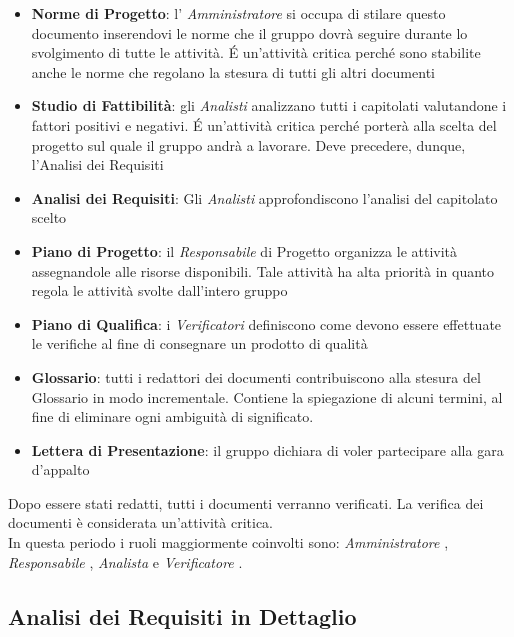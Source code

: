 \begin{itemize}
\item \textbf{Norme di Progetto}: l’ \emph{Amministratore}  si occupa di stilare questo documento
  inserendovi le norme che il gruppo dovrà seguire durante lo svolgimento di tutte
  le attività. \'E un'attività critica perché sono stabilite anche le norme
  che regolano la stesura di tutti gli altri documenti

\item \textbf{Studio di Fattibilità}: gli  \emph{Analisti}  analizzano tutti i capitolati valutandone
  i fattori positivi e negativi. \'E un'attività critica perché porterà alla scelta del
  progetto sul quale il gruppo andrà a lavorare. Deve precedere, dunque, l'Analisi dei
  Requisiti

\item \textbf{Analisi dei Requisiti}: Gli  \emph{Analisti}  approfondiscono l'analisi del capitolato
  scelto

\item \textbf{Piano di Progetto}: il  \emph{Responsabile}  di Progetto organizza le attività assegnandole
  alle risorse disponibili. Tale attività ha alta priorità in quanto regola le attività
  svolte dall’intero gruppo

\item \textbf{Piano di Qualifica}: i  \emph{Verificatori}  definiscono come devono essere effettuate le
  verifiche al fine di consegnare un prodotto di qualità

\item \textbf{Glossario}: tutti i redattori dei documenti contribuiscono alla stesura del
  Glossario in modo incrementale. Contiene la spiegazione di alcuni termini, al fine di
  eliminare ogni ambiguità di significato.

\item \textbf{Lettera di Presentazione}: il gruppo dichiara di voler partecipare alla gara d'appalto

\end{itemize}

Dopo essere stati redatti, tutti i documenti verranno  verificati. La verifica dei
documenti è considerata un'attività critica.\\
In questa periodo i ruoli maggiormente coinvolti sono:  \emph{Amministratore} ,  \emph{Responsabile} ,
 \emph{Analista}  e  \emph{Verificatore} .

\subsection{Analisi dei Requisiti in Dettaglio}

